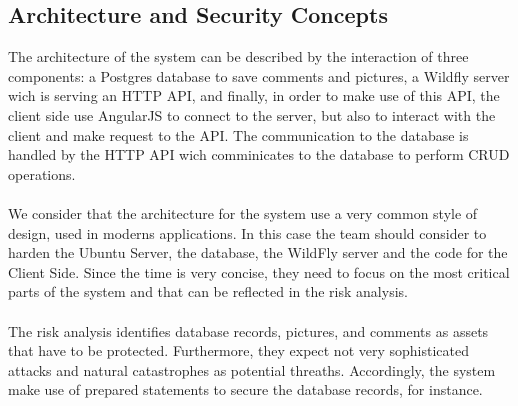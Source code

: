\subsection{Architecture and Security Concepts}

The architecture of the system can be described by the interaction of three components: a Postgres database to save comments and pictures, a Wildfly server wich is serving an HTTP API, and finally, in order to make use of this API, the client side use AngularJS to connect to the server, but also to interact with the client and make request to the API. The communication to the database is handled by the HTTP API wich comminicates to the database to perform CRUD operations. \\ \\ 
We consider that the architecture for the system use a very common style of design, used in moderns applications. In this case the team should consider to harden the Ubuntu Server, the database, the WildFly server and the code for the Client Side. Since the time is very concise, they need to focus on the most critical parts of the system and that can be reflected in the risk analysis.\\ \\
The risk analysis identifies database records, pictures, and comments as assets that have to be protected. Furthermore, they expect not very sophisticated attacks and natural catastrophes as potential threaths. Accordingly, the system make  use of prepared statements to secure the database records, for instance.\\ \\
 
